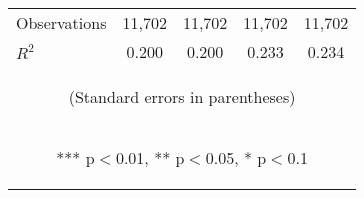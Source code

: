 \begin{center}
\begin{tabular}{lcccc}
\midrule Observations & 11,702 & 11,702 & 11,702 & 11,702 \\
 $R^2$ & 0.200 & 0.200 & 0.233 & 0.234 \\ \bottomrule
\multicolumn{5}{c}{\begin{footnotesize} (Standard errors in parentheses)\end{footnotesize}} \\
\multicolumn{5}{c}{\begin{footnotesize} *** p$<$0.01, ** p$<$0.05, * p$<$0.1\end{footnotesize}} \\
\end{tabular}
\end{center}
